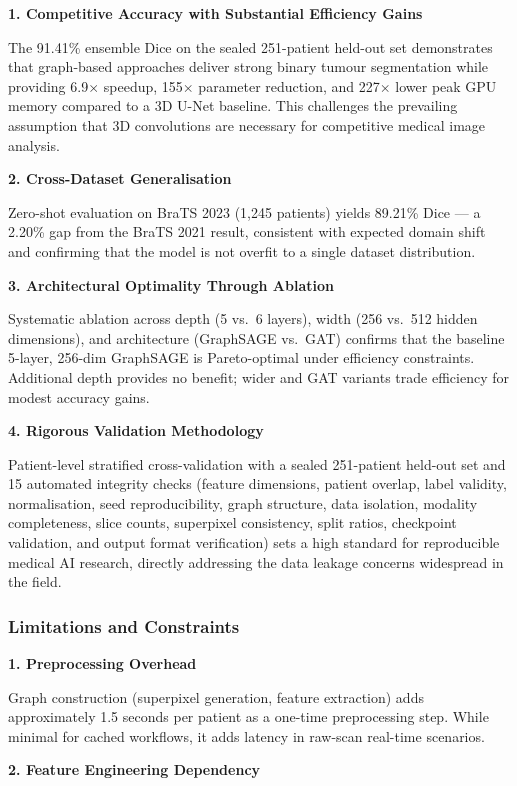 \textbf{1. Competitive Accuracy with Substantial Efficiency Gains}

The 91.41\% ensemble Dice on the sealed 251-patient held-out set demonstrates that graph-based approaches deliver strong binary tumour segmentation while providing 6.9$\times$ speedup, 155$\times$ parameter reduction, and 227$\times$ lower peak GPU memory compared to a 3D U-Net baseline. This challenges the prevailing assumption that 3D convolutions are necessary for competitive medical image analysis.

\textbf{2. Cross-Dataset Generalisation}

Zero-shot evaluation on BraTS 2023 (1,245 patients) yields 89.21\% Dice — a 2.20\% gap from the BraTS 2021 result, consistent with expected domain shift and confirming that the model is not overfit to a single dataset distribution.

\textbf{3. Architectural Optimality Through Ablation}

Systematic ablation across depth (5 vs.\ 6 layers), width (256 vs.\ 512 hidden dimensions), and architecture (GraphSAGE vs.\ GAT) confirms that the baseline 5-layer, 256-dim GraphSAGE is Pareto-optimal under efficiency constraints. Additional depth provides no benefit; wider and GAT variants trade efficiency for modest accuracy gains.

\textbf{4. Rigorous Validation Methodology}

Patient-level stratified cross-validation with a sealed 251-patient held-out set and 15 automated integrity checks (feature dimensions, patient overlap, label validity, normalisation, seed reproducibility, graph structure, data isolation, modality completeness, slice counts, superpixel consistency, split ratios, checkpoint validation, and output format verification) sets a high standard for reproducible medical AI research, directly addressing the data leakage concerns widespread in the field.

\subsubsection{Limitations and Constraints}

\textbf{1. Preprocessing Overhead}

Graph construction (superpixel generation, feature extraction) adds approximately 1.5 seconds per patient as a one-time preprocessing step. While minimal for cached workflows, it adds latency in raw-scan real-time scenarios.

\textbf{2. Feature Engineering Dependency}


